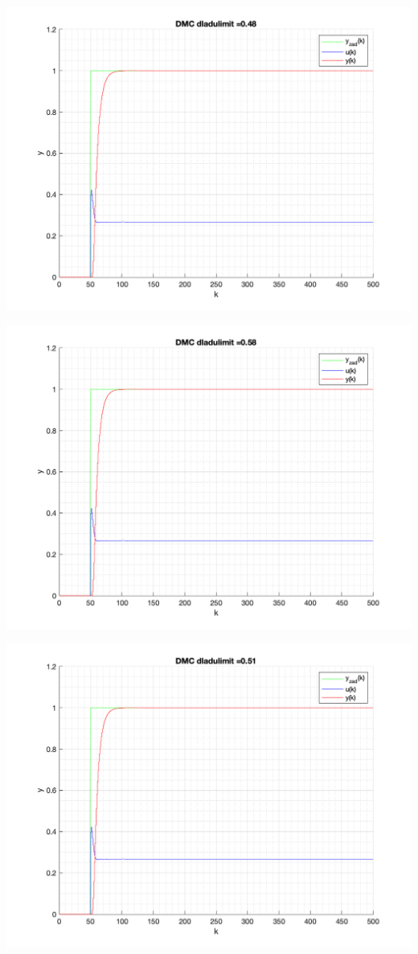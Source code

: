 \documentclass[a4paper, 11pt]{article}
\begin{document}
\begin{enumerate}
 \includegraphics[width=\linewidth]{./ModelsP6_dulimit/P4_DMC_dulimit_0_48_png.png} 
 
 \includegraphics[width=\linewidth]{./ModelsP6_dulimit/P4_DMC_dulimit_0_58_png.png} 
 
 \includegraphics[width=\linewidth]{./ModelsP6_dulimit/P4_DMC_dulimit_0_51_png.png} 
 

\end{enumerate}
\end{document}
